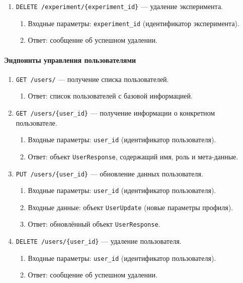 \begin{enumerate}
    \item \texttt{DELETE /experiment/\{experiment\_id\}} — удаление эксперимента.
    \begin{enumerate}[label=\arabic{enumi}.\arabic*.]
        \item Входные параметры: \texttt{experiment\_id} (идентификатор эксперимента).
        \item Ответ: сообщение об успешном удалении.
    \end{enumerate}
\end{enumerate}

\paragraph{Эндпоинты управления пользователями}

\begin{enumerate}
    \item \texttt{GET /users/} — получение списка пользователей.
    \begin{enumerate}[label=\arabic{enumi}.\arabic*.]
        \item Ответ: список пользователей с базовой информацией.
    \end{enumerate}

    \item \texttt{GET /users/\{user\_id\}} — получение информации о конкретном пользователе.
    \begin{enumerate}[label=\arabic{enumi}.\arabic*.]
        \item Входные параметры: \texttt{user\_id} (идентификатор пользователя).
        \item Ответ: объект \texttt{UserResponse}, содержащий имя, роль и мета-данные.
    \end{enumerate}

    \item \texttt{PUT /users/\{user\_id\}} — обновление данных пользователя.
    \begin{enumerate}[label=\arabic{enumi}.\arabic*.]
        \item Входные параметры: \texttt{user\_id} (идентификатор пользователя).
        \item Входные данные: объект \texttt{UserUpdate} (новые параметры профиля).
        \item Ответ: обновлённый объект \texttt{UserResponse}.
    \end{enumerate}

    \item \texttt{DELETE /users/\{user\_id\}} — удаление пользователя.
    \begin{enumerate}[label=\arabic{enumi}.\arabic*.]
        \item Входные параметры: \texttt{user\_id} (идентификатор пользователя).
        \item Ответ: сообщение об успешном удалении.
    \end{enumerate}
\end{enumerate}

